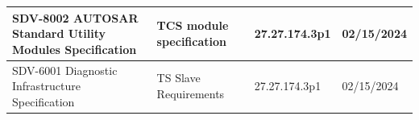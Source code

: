 \begin{longtable}{|l|l|l|l|}
\begin{minipage}{0.39\linewidth}\raggedright\vspace{.75ex}SDV-8002 AUTOSAR Standard Utility Modules Specification\vspace{.75ex}\end{minipage} & \begin{minipage}{0.19\linewidth}\raggedright\vspace{.75ex}TCS module specification\vspace{.75ex}\end{minipage} & \begin{minipage}{0.19\linewidth}\raggedright\vspace{.75ex}27.27.174.3p1\vspace{.75ex}\end{minipage} & \begin{minipage}{0.12\linewidth}\raggedright\vspace{.75ex}02/15/2024\vspace{.75ex}\end{minipage}\\\hline
\begin{minipage}{0.39\linewidth}\raggedright\vspace{.75ex}SDV-6001 Diagnostic Infrastructure Specification\vspace{.75ex}\end{minipage} & \begin{minipage}{0.19\linewidth}\raggedright\vspace{.75ex}TS Slave Requirements\vspace{.75ex}\end{minipage} & \begin{minipage}{0.19\linewidth}\raggedright\vspace{.75ex}27.27.174.3p1\vspace{.75ex}\end{minipage} & \begin{minipage}{0.12\linewidth}\raggedright\vspace{.75ex}02/15/2024\vspace{.75ex}\end{minipage}\\\hline
\end{longtable}